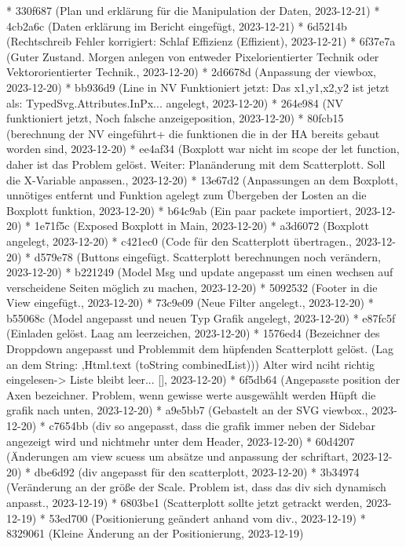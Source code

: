 \documentclass[usegeometry=true]{scrartcl}
\begin{document}
* 330f687 (Plan und erklärung für die Manipulation der Daten, 2023-12-21)
* 4cb2a6c (Daten erklärung im Bericht eingefügt, 2023-12-21)
* 6d5214b (Rechtschreib Fehler korrigiert: Schlaf Effizienz (Effizient), 2023-12-21)
* 6f37e7a (Guter Zustand. Morgen anlegen von entweder Pixelorientierter Technik oder Vektororientierter Technik., 2023-12-20)
* 2d6678d (Anpassung der viewbox, 2023-12-20)
* bb936d9 (Line in NV Funktioniert jetzt: Das x1,y1,x2,y2 ist jetzt als: TypedSvg.Attributes.InPx... angelegt, 2023-12-20)
* 264e984 (NV funktioniert jetzt, Noch falsche anzeigeposition, 2023-12-20)
* 80fcb15 (berechnung der NV eingeführt+ die funktionen die in der HA bereits gebaut worden sind, 2023-12-20)
* ee4af34 (Boxplott war nicht im scope der let function, daher ist das Problem gelöst. Weiter: Planänderung mit dem Scatterplott. Soll die X-Variable anpassen., 2023-12-20)
* 13e67d2 (Anpassungen an dem Boxplott, unnötiges entfernt und Funktion agelegt zum Übergeben der Losten an die Boxplott funktion, 2023-12-20)
* b64c9ab (Ein paar packete importiert, 2023-12-20)
* 1e71f5c (Exposed Boxplott in Main, 2023-12-20)
* a3d6072 (Boxplott angelegt, 2023-12-20)
* c421ec0 (Code für den Scatterplott übertragen., 2023-12-20)
* d579e78 (Buttons eingefügt. Scatterplott berechnungen noch verändern, 2023-12-20)
* b221249 (Model Msg und update angepasst um einen wechsen auf verscheidene Seiten möglich zu machen, 2023-12-20)
* 5092532 (Footer in die View eingefügt., 2023-12-20)
* 73c9e09 (Neue Filter angelegt., 2023-12-20)
* b55068c (Model angepasst und neuen Typ Grafik angelegt, 2023-12-20)
* e87fc5f (Einladen gelöst. Laag am leerzeichen, 2023-12-20)
* 1576ed4 (Bezeichner des Droppdown angepasst und Problemmit dem hüpfenden Scatterplott gelöst. (Lag an dem String: ,Html.text (toString combinedList))) Alter wird nciht richtig eingelesen-> Liste bleibt leer... [], 2023-12-20)
* 6f5db64 (Angepasste position der Axen bezeichner. Problem, wenn gewisse werte ausgewählt werden Hüpft die grafik  nach unten, 2023-12-20)
* a9e5bb7 (Gebastelt an der SVG viewbox., 2023-12-20)
* c7654bb (div so angepasst, dass die grafik immer neben der Sidebar angezeigt wird und nichtmehr unter dem Header, 2023-12-20)
* 60d4207 (Änderungen am view scuess um absätze und anpassung der schriftart, 2023-12-20)
* dbe6d92 (div angepasst für den scatterplott, 2023-12-20)
* 3b34974 (Veränderung an der größe der Scale. Problem ist, dass das div sich dynamisch anpasst., 2023-12-19)
* 6803be1 (Scatterplott sollte jetzt getrackt werden, 2023-12-19)
* 53ed700 (Positionierung geändert anhand vom div., 2023-12-19)
* 8329061 (Kleine Änderung an der Positionierung, 2023-12-19)
\end{document}
